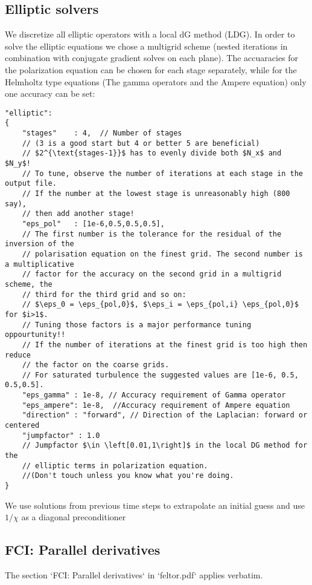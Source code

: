\subsection{Elliptic solvers}
We discretize all elliptic operators with a local dG method (LDG).  In order to
solve the elliptic equations we chose a multigrid scheme (nested iterations in
combination with conjugate gradient solves on each plane). The accuaracies for
the polarization equation can be chosen for each stage separately, while for
the Helmholtz type equations (The gamma operators and the Ampere equation) only
one accuracy can be set:
\begin{verbatim}
"elliptic":
{
    "stages"    : 4,  // Number of stages
    // (3 is a good start but 4 or better 5 are beneficial)
    // $2^{\text{stages-1}}$ has to evenly divide both $N_x$ and $N_y$!
    // To tune, observe the number of iterations at each stage in the output file.
    // If the number at the lowest stage is unreasonably high (800 say),
    // then add another stage!
    "eps_pol"   : [1e-6,0.5,0.5,0.5],
    // The first number is the tolerance for the residual of the inversion of the
    // polarisation equation on the finest grid. The second number is a multiplicative
    // factor for the accuracy on the second grid in a multigrid scheme, the
    // third for the third grid and so on:
    // $\eps_0 = \eps_{pol,0}$, $\eps_i = \eps_{pol,i} \eps_{pol,0}$  for $i>1$.
    // Tuning those factors is a major performance tuning oppourtunity!!
    // If the number of iterations at the finest grid is too high then reduce
    // the factor on the coarse grids.
    // For saturated turbulence the suggested values are [1e-6, 0.5, 0.5,0.5].
    "eps_gamma" : 1e-8, // Accuracy requirement of Gamma operator
    "eps_ampere": 1e-8,  //Accuracy requirement of Ampere equation
    "direction" : "forward", // Direction of the Laplacian: forward or centered
    "jumpfactor" : 1.0
    // Jumpfactor $\in \left[0.01,1\right]$ in the local DG method for the
    // elliptic terms in polarization equation.
    //(Don't touch unless you know what you're doing.
}
\end{verbatim}
\begin{tcolorbox}[title=Note]
    We use solutions from previous time steps to extrapolate an initial guess
    and use $1/\chi$ as a diagonal preconditioner
\end{tcolorbox}
\subsection{FCI: Parallel derivatives}
The section `FCI: Parallel derivatives` in `feltor.pdf` applies verbatim.

